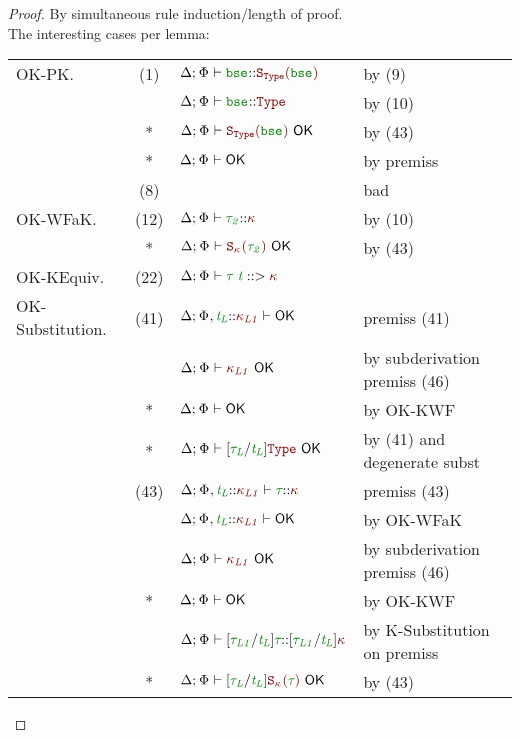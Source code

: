 \documentclass[11pt]{article}
\begin{document}
    \begin{proof}
        By simultaneous rule induction/length of proof. \\
        The interesting cases per lemma: \\
        \begin{tabular*}{\textwidth}{lc@{\extracolsep{\fill}}ll}
            OK-PK.
                &(1)& $\WellFormedAtKind{\bse}[\SKind[\Type][\bse]]$ & by (9) \\
                & & $\WellFormedAtKind{\bse}[\Type]$ & by (10) \\
                &*& $\KindWellFormed[{\SKind[\Type][\bse]}]$ & by (43) \\
                &*& $\ContextWellFormed$ & by premiss \\
                &(8)& & bad \\
            OK-WFaK.
                &(12)& $\WellFormedAtKind{\typ[2]}$ & by (10) \\
                &*& $\KindWellFormed[{\SKind[\knd][\typ[2]]}]$ & by (43) \\
            OK-KEquiv.
                &(22)& $\PrincipalKind{\TypeAp[\typ][\typvar]}$ & \\
            OK-Substitution.
                &(41)& $\ContextWellFormed[\HoleCtx\ExtendTypVarCtx[][L][{\knd[L1]}]]$ & premiss (41) \\
                & & $\KindWellFormed[{\knd[L1]}]$ & by subderivation premiss (46) \\
                &*& $\ContextWellFormed$ & by OK-KWF \\
                &*& $\KindWellFormed[\subst{\typ[L]}{\typvar[L]}{\Type}]$ & by (41) and degenerate subst \\
                &(43)& $\WellFormedAtKind[\HoleCtx\ExtendTypVarCtx[][L][{\knd[L1]}]]{\typ}[\knd]$ & premiss (43) \\
                & & $\ContextWellFormed[\HoleCtx\ExtendTypVarCtx[][L][{\knd[L1]}]]$ & by OK-WFaK \\
                & & $\KindWellFormed[{\knd[L1]}]$ & by subderivation premiss (46) \\
                &*& $\ContextWellFormed$ & by OK-KWF \\
                & & $\WellFormedAtKind{\subst{\typ[L1]}{\typvar[L]}{\typ}}[\subst{\typ[L1]}{\typvar[L]}{\knd}]$ & by K-Substitution on premiss \\
                &*& $\KindWellFormed[\subst{\typ[L]}{\typvar[L]}{\SKind}]$ & by (43) \\
        \end{tabular*}
    \end{proof}
\end{document}

